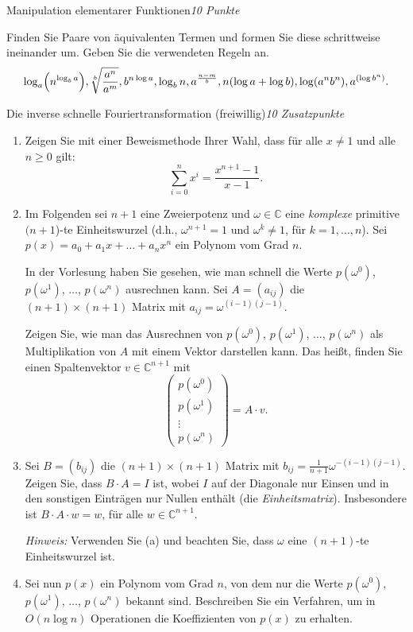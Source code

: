 \documentclass[a4paper,twoside,12pt]{article}
\newcounter{AUFGNR}
\newcommand{\AUFGABE}[2]{\vspace{0.3cm}\item[Aufgabe \arabic{AUFGNR}]\stepcounter{AUFGNR} #1\hfill\emph{#2}}
\begin{document}
\begin{description}
\AUFGABE{Manipulation elementarer Funktionen}{10 Punkte}

Finden Sie Paare von \"aquivalenten Termen und formen Sie diese
schrittweise ineinander um. Geben Sie die verwendeten Regeln an.
\[
 \log_a\Bigl(n^{\log_b a}\Bigr), \sqrt[b]{\frac{a^n}{a^m}},
 b^{n \log a}, \log_b n, a^{\frac{n-m}{b}}, n(\log a + \log b),
 \log(a^nb^n),a^{(\log b^n)}.
\]
\iffalse
\AUFGABE{Die inverse schnelle Fouriertransformation (freiwillig)}
{10 Zusatzpunkte}

\begin{enumerate}
\item Zeigen Sie mit einer Beweismethode Ihrer Wahl,
dass f\"ur alle $x \not= 1$ und alle $n \geq 0$ gilt:
\[
\sum_{i=0}^{n} x^i = \frac{x^{n+1}-1}{x-1}.
\]
\item Im Folgenden sei $n+1$ eine Zweierpotenz und
$\omega \in \mathbb{C}$ eine 
\emph{komplexe} primitive $(n+1$)-te Einheitswurzel
(d.h., $\omega^{n+1} = 1$ und $\omega^k \neq 1$, f\"ur
$k=1, \dots, n$).
Sei $p(x) = a_0 + a_1 x + \dots + a_{n} x^{n}$
ein Polynom vom Grad $n$.

In der Vorlesung haben Sie gesehen,
wie man schnell die Werte $p(\omega^0)$,
$p(\omega^1)$, $\ldots$, $p(\omega^{n})$ ausrechnen kann.
Sei $A = (a_{ij})$ die $(n+1) \times (n+1)$ Matrix
mit $a_{ij} = \omega^{(i-1)(j-1)}$.

Zeigen Sie, wie man das Ausrechnen von
$p(\omega^0)$,
$p(\omega^1)$, $\ldots$, $p(\omega^{n})$
als Multiplikation von
$A$ mit einem Vektor darstellen kann. Das hei\ss{}t, finden
Sie einen Spaltenvektor $v \in \mathbb{C}^{n+1}$ mit
\[
\left(\begin{matrix} p(\omega^0) \\ p(\omega^1) \\ \vdots \\ p(\omega^{n}) 
\end{matrix} \right)= A\cdot v.
\]
\item
  Sei $B = (b_{ij})$ die $(n+1) \times (n+1)$ Matrix mit
  $b_{ij} = \frac{1}{n+1}\omega^{-(i-1)(j-1)}$.
  Zeigen Sie, dass $B \cdot A = I$ ist, wobei $I$ 
  auf der Diagonale nur Einsen und in den
  sonstigen Eintr\"agen nur Nullen enth\"alt (die \emph{Einheitsmatrix}). 
  Insbesondere ist
  $B \cdot A \cdot w = w$, f\"ur alle $w \in \mathbb{C}^{n+1}$.

  \emph{Hinweis:} Verwenden Sie (a) und beachten Sie, dass $\omega$
      eine $(n+1)$-te Einheitswurzel ist.

\item Sei nun $p(x)$ ein Polynom vom Grad $n$,
  von dem nur die Werte
  $p(\omega^0)$, $p(\omega^1)$, $\ldots$, $p(\omega^{n})$
  bekannt sind.
  Beschreiben Sie ein Verfahren, um in
  $O(n \log n)$ Operationen die Koeffizienten
  von $p(x)$ zu erhalten. 


\end{enumerate}
\end{description}
\end{document}

